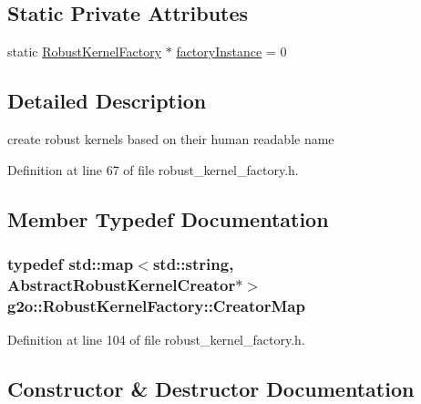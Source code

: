 \subsection*{Static Private Attributes}
\begin{DoxyCompactItemize}
\item 
static \hyperlink{classg2o_1_1RobustKernelFactory}{Robust\+Kernel\+Factory} $\ast$ \hyperlink{classg2o_1_1RobustKernelFactory_a598761493f11f50bee72b4799fab050e}{factory\+Instance} = 0
\end{DoxyCompactItemize}


\subsection{Detailed Description}
create robust kernels based on their human readable name 

Definition at line 67 of file robust\+\_\+kernel\+\_\+factory.\+h.



\subsection{Member Typedef Documentation}
\subsubsection[{\texorpdfstring{Creator\+Map}{CreatorMap}}]{\setlength{\rightskip}{0pt plus 5cm}typedef std\+::map$<$std\+::string, {\bf Abstract\+Robust\+Kernel\+Creator}$\ast$$>$ {\bf g2o\+::\+Robust\+Kernel\+Factory\+::\+Creator\+Map}\hspace{0.3cm}{\ttfamily [protected]}}\hypertarget{classg2o_1_1RobustKernelFactory_aa143765542cbf4738e2137d61517b218}{}\label{classg2o_1_1RobustKernelFactory_aa143765542cbf4738e2137d61517b218}


Definition at line 104 of file robust\+\_\+kernel\+\_\+factory.\+h.



\subsection{Constructor \& Destructor Documentation}
